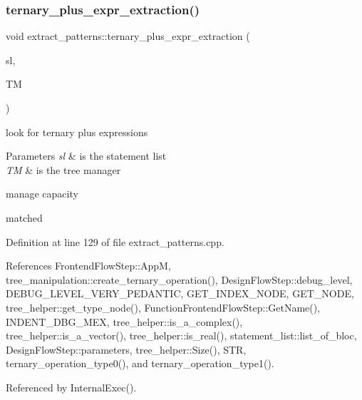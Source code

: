 \subsubsection{\texorpdfstring{ternary\+\_\+plus\+\_\+expr\+\_\+extraction()}{ternary\_plus\_expr\_extraction()}}
{\footnotesize\ttfamily void extract\+\_\+patterns\+::ternary\+\_\+plus\+\_\+expr\+\_\+extraction (\begin{DoxyParamCaption}\item[{\hyperlink{structstatement__list}{statement\+\_\+list} $\ast$}]{sl,  }\item[{\hyperlink{tree__manager_8hpp_a96ff150c071ce11a9a7a1e40590f205e}{tree\+\_\+manager\+Ref}}]{TM }\end{DoxyParamCaption})\hspace{0.3cm}{\ttfamily [private]}}



look for ternary plus expressions 


\begin{DoxyParams}{Parameters}
{\em sl} & is the statement list \\
\hline
{\em TM} & is the tree manager \\
\hline
\end{DoxyParams}
manage capacity

matched 

Definition at line 129 of file extract\+\_\+patterns.\+cpp.



References Frontend\+Flow\+Step\+::\+AppM, tree\+\_\+manipulation\+::create\+\_\+ternary\+\_\+operation(), Design\+Flow\+Step\+::debug\+\_\+level, D\+E\+B\+U\+G\+\_\+\+L\+E\+V\+E\+L\+\_\+\+V\+E\+R\+Y\+\_\+\+P\+E\+D\+A\+N\+T\+IC, G\+E\+T\+\_\+\+I\+N\+D\+E\+X\+\_\+\+N\+O\+DE, G\+E\+T\+\_\+\+N\+O\+DE, tree\+\_\+helper\+::get\+\_\+type\+\_\+node(), Function\+Frontend\+Flow\+Step\+::\+Get\+Name(), I\+N\+D\+E\+N\+T\+\_\+\+D\+B\+G\+\_\+\+M\+EX, tree\+\_\+helper\+::is\+\_\+a\+\_\+complex(), tree\+\_\+helper\+::is\+\_\+a\+\_\+vector(), tree\+\_\+helper\+::is\+\_\+real(), statement\+\_\+list\+::list\+\_\+of\+\_\+bloc, Design\+Flow\+Step\+::parameters, tree\+\_\+helper\+::\+Size(), S\+TR, ternary\+\_\+operation\+\_\+type0(), and ternary\+\_\+operation\+\_\+type1().



Referenced by Internal\+Exec().

